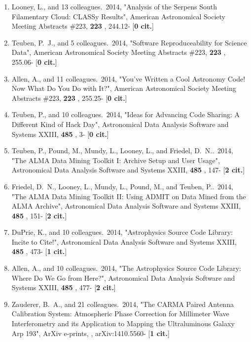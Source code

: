 \documentclass[11pt,letterpaper]{article}
\begin{document}
\begin{enumerate}[resume,label=\textbf{\arabic*}.]
\item  
Looney, L., and 13 colleagues.\  2014,  "Analysis of the Serpens South 
Filamentary Cloud: CLASSy Results", American Astronomical Society Meeting 
Abstracts \#223,  {\bf 223} , 244.12- [{\bf 0 cit.}] 

\item  
Teuben, P.~J., and 5 colleagues.\  2014,  "Software Reproduceability for 
Science Data", American Astronomical Society Meeting Abstracts \#223,  {\bf 
223} , 255.06- [{\bf 0 cit.}] 

\item  
Allen, A., and 11 colleagues.\  2014,  "You've Written a Cool Astronomy 
Code! Now What Do You Do with It?", American Astronomical Society Meeting 
Abstracts \#223,  {\bf 223} , 255.25- [{\bf 0 cit.}] 

\item  
Teuben, P., and 10 colleagues.\  2014,  "Ideas for Advancing Code Sharing: 
A Different Kind of Hack Day", Astronomical Data Analysis Software and 
Systems XXIII,  {\bf 485} , 3- [{\bf 0 cit.}] 

\item  
Teuben, P., Pound, M., Mundy, L., Looney, L., and Friedel, D.~N..\  2014,  
"The ALMA Data Mining Toolkit I: Archive Setup and User Usage", 
Astronomical Data Analysis Software and Systems XXIII,  {\bf 485} , 147- 
[{\bf 2 cit.}] 

\item  
Friedel, D.~N., Looney, L., Mundy, L., Pound, M., and Teuben, P..\  2014,  
"The ALMA Data Mining Toolkit II: Using ADMIT on Data Mined from the ALMA 
Archive", Astronomical Data Analysis Software and Systems XXIII,  {\bf 485} 
, 151- [{\bf 2 cit.}] 

\item  
DuPrie, K., and 10 colleagues.\  2014,  "Astrophysics Source Code Library: 
Incite to Cite!", Astronomical Data Analysis Software and Systems XXIII,  
{\bf 485} , 473- [{\bf 1 cit.}] 

\item  
Allen, A., and 10 colleagues.\  2014,  "The Astrophysics Source Code 
Library: Where Do We Go from Here?", Astronomical Data Analysis Software 
and Systems XXIII,  {\bf 485} , 477- [{\bf 2 cit.}] 

\item  
Zauderer, B.~A., and 21 colleagues.\  2014,  "The CARMA Paired Antenna 
Calibration System: Atmospheric Phase Correction for Millimeter Wave 
Interferometry and its Application to Mapping the Ultraluminous Galaxy Arp 
193", ArXiv e-prints,  , arXiv:1410.5560- [{\bf 1 cit.}] 


\end{enumerate}
\end{document}
